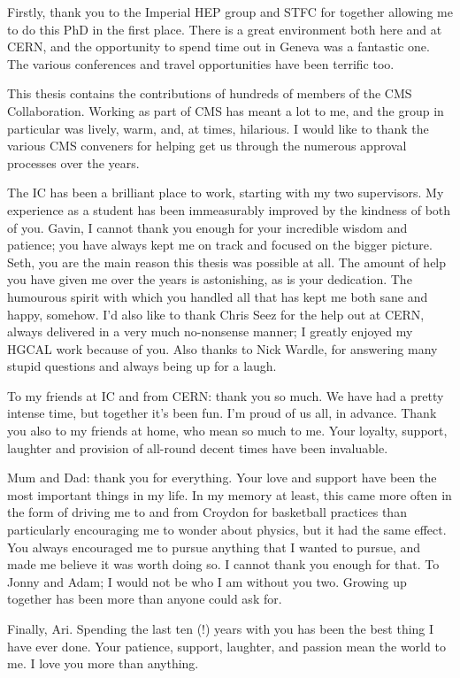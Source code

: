 Firstly, thank you to the Imperial HEP group and STFC for together 
allowing me to do this PhD in the first place. 
There is a great environment both here and at CERN, 
and the opportunity to spend time out in Geneva was a fantastic one.
The various conferences and travel opportunities have been terrific too.

This thesis contains the contributions of hundreds of members of the CMS Collaboration.
Working as part of CMS has meant a lot to me, 
and the \Hgg group in particular was lively, warm, and, at times, hilarious. 
I would like to thank the various CMS \Hgg conveners for helping get us through 
the numerous approval processes over the years.

The IC \Hgg has been a brilliant place to work, starting with my two supervisors. 
My experience as a student has been immeasurably improved by the kindness of both of you.
Gavin, I cannot thank you enough for your incredible wisdom and patience; 
you have always kept me on track and focused on the bigger picture.
Seth, you are the main reason this thesis was possible at all. 
The amount of help you have given me over the years is astonishing, 
as is your dedication. 
The humourous spirit with which you handled all that has kept me both sane and happy, somehow.
I'd also like to thank Chris Seez for the help out at CERN, 
always delivered in a very much no-nonsense manner; I greatly enjoyed my HGCAL work because of you.
Also thanks to Nick Wardle, for answering many stupid questions and always being up for a laugh.

To my friends at IC and from CERN: thank you so much. 
We have had a pretty intense time, but together it's been fun.
I'm proud of us all, in advance.
Thank you also to my friends at home, who mean so much to me.
Your loyalty, support, laughter and provision of all-round decent times have been invaluable.

Mum and Dad: thank you for everything. 
Your love and support have been the most important things in my life.
In my memory at least, this came more often in the form of driving me to and from Croydon 
for basketball practices than particularly encouraging me to wonder about physics, 
but it had the same effect.
You always encouraged me to pursue anything that I wanted to pursue, 
and made me believe it was worth doing so.
I cannot thank you enough for that.
To Jonny and Adam; I would not be who I am without you two.
Growing up together has been more than anyone could ask for.

Finally, Ari. 
Spending the last ten (!) years with you has been the best thing I have ever done.
Your patience, support, laughter, and passion mean the world to me. 
I love you more than anything.


